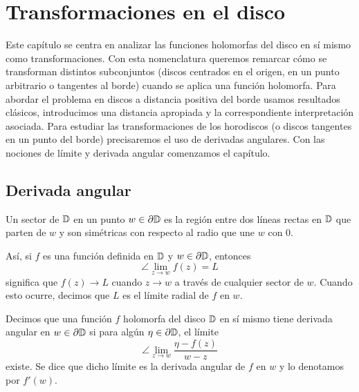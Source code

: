 \chapter{Transformaciones en el disco}
\label{cap:angular}

Este capítulo se centra en analizar las funciones holomorfas del disco en sí mismo como transformaciones. Con esta nomenclatura queremos remarcar cómo se transforman distintos subconjuntos (discos centrados en el origen, en un punto arbitrario o tangentes al borde) cuando se aplica una función holomorfa. Para abordar el problema en discos a distancia positiva del borde usamos resultados clásicos, introducimos una distancia apropiada y la correspondiente interpretación asociada. Para estudiar las transformaciones de los horodiscos (o discos tangentes en un punto del borde) precisaremos el uso de derivadas angulares. Con las nociones de límite y derivada angular comenzamos el capítulo. \\

\section{Derivada angular}

\begin{definition}
    Un sector de $\mathbb{D}$ en un punto $w \in \partial \mathbb{D}$ es la región entre dos líneas rectas en $\mathbb{D}$ que parten de $w$ y son simétricas con respecto  al radio que une $w$ con $0$.
\end{definition}

Así, si $f$ es una función definida en $\mathbb{D}$ y $w \in \partial \mathbb{D}$, entonces
    \begin{equation}
        \angle \lim_{z \to w} f(z) = L
    \end{equation}
    significa que $f(z) \to L$ cuando $z \to w$ a través de cualquier sector de $w$. Cuando esto ocurre, decimos que $L$ es el límite radial de $f$ en $w$. \\

\begin{definition}
    Decimos que una función $f$ holomorfa del disco $\mathbb{D}$ en sí mismo tiene derivada angular en $w \in \partial \mathbb{D}$ si para algún $\eta \in \partial \mathbb{D}$, el límite
    \begin{equation*}
        \angle \lim_{z \to w} \frac{\eta - f(z)}{w - z}
    \end{equation*}
    existe. Se dice que dicho límite es la derivada angular de $f$ en $w$ y lo denotamos por $f'(w)$.
\end{definition}

